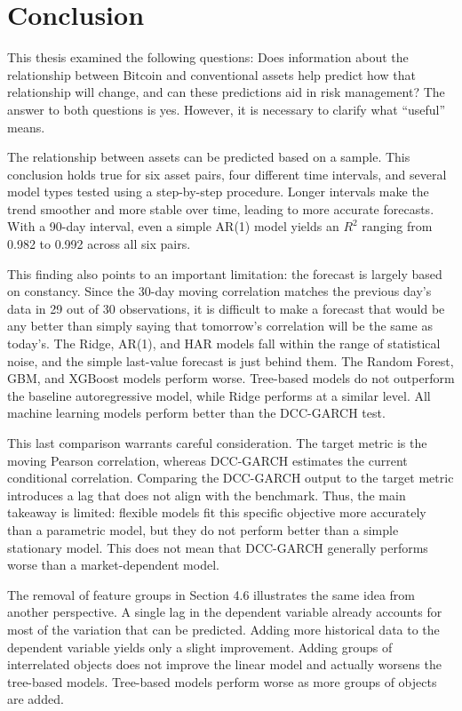 \section{Conclusion}

This thesis examined the following questions: Does information about the relationship between Bitcoin and conventional assets help predict how that relationship will change, and can these predictions aid in risk management? The answer to both questions is yes. However, it is necessary to clarify what ``useful'' means.

The relationship between assets can be predicted based on a sample. This conclusion holds true for six asset pairs, four different time intervals, and several model types tested using a step-by-step procedure. Longer intervals make the trend smoother and more stable over time, leading to more accurate forecasts. With a 90-day interval, even a simple AR(1) model yields an $R^2$ ranging from 0.982 to 0.992 across all six pairs.

This finding also points to an important limitation: the forecast is largely based on constancy. Since the 30-day moving correlation matches the previous day's data in 29 out of 30 observations, it is difficult to make a forecast that would be any better than simply saying that tomorrow's correlation will be the same as today's. The Ridge, AR(1), and HAR models fall within the range of statistical noise, and the simple last-value forecast is just behind them. The Random Forest, GBM, and XGBoost models perform worse. Tree-based models do not outperform the baseline autoregressive model, while Ridge performs at a similar level. All machine learning models perform better than the DCC-GARCH test.

This last comparison warrants careful consideration. The target metric is the moving Pearson correlation, whereas DCC-GARCH estimates the current conditional correlation. Comparing the DCC-GARCH output to the target metric introduces a lag that does not align with the benchmark. Thus, the main takeaway is limited: flexible models fit this specific objective more accurately than a parametric model, but they do not perform better than a simple stationary model. This does not mean that DCC-GARCH generally performs worse than a market-dependent model.

The removal of feature groups in Section 4.6 illustrates the same idea from another perspective. A single lag in the dependent variable already accounts for most of the variation that can be predicted. Adding more historical data to the dependent variable yields only a slight improvement. Adding groups of interrelated objects does not improve the linear model and actually worsens the tree-based models. Tree-based models perform worse as more groups of objects are added.

